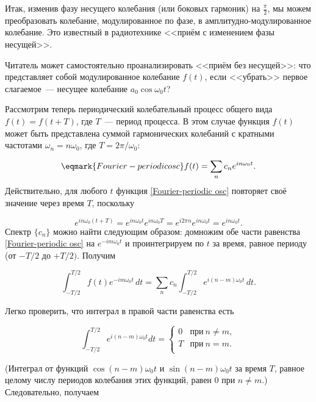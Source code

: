 Итак, изменив фазу несущего колебания (или боковых гармоник) на
$\frac{\pi}{2}$, мы можем преобразовать колебание,
модулированное по фазе, в амплитудно-модулированное колебание. Это известный в
радиотехнике <<приём с изменением фазы несущей>>.

Читатель может самостоятельно проанализировать <<приём без несущей>>: что
представляет собой модулированное колебание
$f(t)$, если <<убрать>> первое слагаемое~--- несущее колебание
$a_0\cos\omega_0t$?


Рассмотрим теперь периодический колебательный процесс общего вида $f(t)=f(t+T)$,
где $T$~--- период процесса. В этом
случае функция $f(t)$ может быть представлена суммой гармонических колебаний с
кратными частотами $\omega_n=n\omega_0$,
где $T=2\pi/\omega_0$:

\begin{equation}
    \eqmark{Fourier-periodic osc}
    f(t)=\sum_n c_n e^{in\omega_0 t}.
\end{equation}
Действительно, для любого $t$ функция \eqref{Fourier-periodic osc} повторяет
своё значение через время $T$, поскольку

\begin{equation*}
    e^{in\omega_0(t+T)}=e^{in\omega_0t}e^{in\omega_0T}=e^{i2\pi
n}e^{in\omega_0t}=e^{in\omega_0t}.
\end{equation*}
Спектр $\{c_n\}$ можно найти следующим образом: домножим обе части равенства
\eqref{Fourier-periodic osc} на $e^{-im\omega_0 t}$ и
проинтегрируем по $t$ за время, равное периоду (от $-T/2$ до $+T/2)$. Получим

\begin{equation*}
    \int_{-T/2}^{T/2} f(t)e^{-im\omega_0t}\,dt=\sum_n c_n\int_{-T/2}^{T/2}
e^{i(n-m)\omega_0 t}\,dt.
\end{equation*}

Легко проверить, что интеграл в правой части равенства есть

\begin{equation*}
    \int_{-T/2}^{T/2}e^{i(n-m)\omega_0 t}dt =
    \begin{cases}
        0 & \text{при}~ n\ne m,\\
        T & \text{при}~ n = m.\\
    \end{cases}
\end{equation*}

(Интеграл от функций $\cos(n-m)\omega_0t$ и $\sin(n-m)\omega_0t$ за время $T$,
равное целому числу периодов колебания этих
функций, равен 0 при $n\ne m$.) Следовательно, получаем

